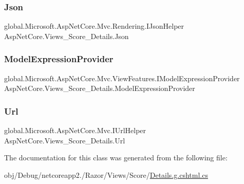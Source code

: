\subsubsection{\texorpdfstring{Json}{Json}}
{\footnotesize\ttfamily global.\+Microsoft.\+Asp\+Net\+Core.\+Mvc.\+Rendering.\+I\+Json\+Helper Asp\+Net\+Core.\+Views\+\_\+\+Score\+\_\+\+Details.\+Json\hspace{0.3cm}{\ttfamily [get]}}

\mbox{\label{class_asp_net_core_1_1_views___score___details_acfaffd27348ff2875b92d05e72d74760}} 
\subsubsection{\texorpdfstring{ModelExpressionProvider}{ModelExpressionProvider}}
{\footnotesize\ttfamily global.\+Microsoft.\+Asp\+Net\+Core.\+Mvc.\+View\+Features.\+I\+Model\+Expression\+Provider Asp\+Net\+Core.\+Views\+\_\+\+Score\+\_\+\+Details.\+Model\+Expression\+Provider\hspace{0.3cm}{\ttfamily [get]}}

\mbox{\label{class_asp_net_core_1_1_views___score___details_aacc227c941bbeac36cf7c3df485d4211}} 
\subsubsection{\texorpdfstring{Url}{Url}}
{\footnotesize\ttfamily global.\+Microsoft.\+Asp\+Net\+Core.\+Mvc.\+I\+Url\+Helper Asp\+Net\+Core.\+Views\+\_\+\+Score\+\_\+\+Details.\+Url\hspace{0.3cm}{\ttfamily [get]}}



The documentation for this class was generated from the following file\+:\begin{DoxyCompactItemize}
\item 
obj/\+Debug/netcoreapp2./\+Razor/\+Views/\+Score/\mbox{\hyperlink{_details_8g_8cshtml_8cs}{Details.\+g.\+cshtml.\+cs}}\end{DoxyCompactItemize}
